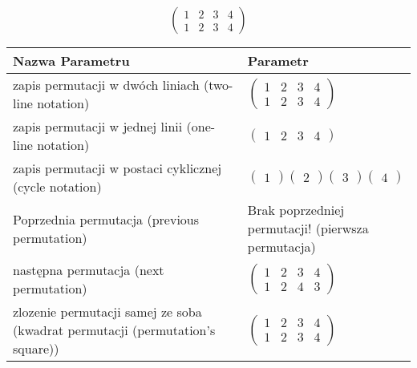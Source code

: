 \documentclass[12pt]{article}
\begin{document}
\subsection{}
\begin{center}
\[
\begin{pmatrix}
	1 & 2 & 3 & 4 \\ 
	1 & 2 & 3 & 4 
\end{pmatrix}
\]

\begin{tabular}{|m{0.6\linewidth}|m{0.4\linewidth}|}
	\hline
	Nazwa Parametru & Parametr \\
	\hline
	zapis permutacji w dwóch liniach (two-line notation) & $\begin{pmatrix} 1 & 2 & 3 & 4 \\ 
1 & 2 & 3 & 4 \end{pmatrix}$ \\ 
	\hline
	zapis permutacji w jednej linii (one-line notation) & $\begin{pmatrix} 1 & 2 & 3 & 4 \end{pmatrix}$ \\ 
	\hline
	zapis permutacji w postaci cyklicznej (cycle notation) & $\begin{pmatrix} 1 \end{pmatrix} \begin{pmatrix} 2 \end{pmatrix} \begin{pmatrix} 3 \end{pmatrix} \begin{pmatrix} 4 \end{pmatrix} $ \\ 
	\hline
	Poprzednia permutacja (previous permutation) & Brak poprzedniej permutacji! (pierwsza permutacja)\\ 
	\hline
	następna permutacja (next permutation) & $\begin{pmatrix} 1 & 2 & 3 & 4 \\ 
1 & 2 & 4 & 3 \end{pmatrix}$ \\ 
	\hline
	zlozenie permutacji samej ze soba (kwadrat permutacji (permutation's square)) & $\begin{pmatrix} 1 & 2 & 3 & 4 \\ 
1 & 2 & 3 & 4 \end{pmatrix}$ \\ 
	\hline
\end{tabular}
\end{center}
\end{document}
